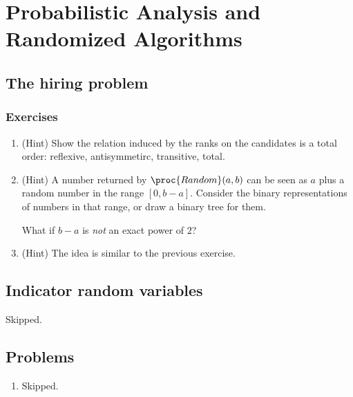 \setcounter{chapter}{4}
\chapter{Probabilistic Analysis and Randomized Algorithms}
\section{The hiring problem}
\subsection*{Exercises}
\begin{enumerate}[\thesection-1]
%
\item (Hint) Show the relation induced by the ranks on the candidates is a total order: reflexive, antisymmetirc, transitive, total.
%
\item (Hint) A number returned by $\proc{Random}(a, b)$ can be seen as $a$ plus a random number in the range $[0, b - a]$. Consider the binary representations of numbers in that range, or draw a binary tree for them.
\begin{remark}
What if $b - a$ is \emph{not} an exact power of $2$?
\end{remark}
%
\item (Hint) The idea is similar to the previous exercise.
%
\end{enumerate}

\section{Indicator random variables}
Skipped.

\section*{Problems}
\begin{enumerate}[\thechapter-1]
%
\item Skipped.
%
\end{enumerate}